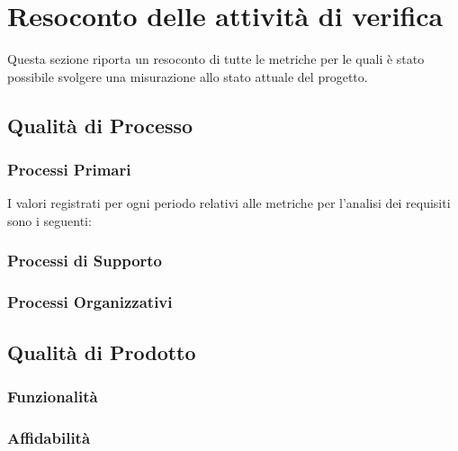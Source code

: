 \section{Resoconto delle attività di verifica}
	Questa sezione riporta un resoconto di tutte le metriche per le quali è stato possibile svolgere una misurazione allo stato attuale del progetto.

	\subsection{Qualità di Processo}
		\subsubsection{Processi Primari}		%
				I valori registrati per ogni periodo relativi alle metriche per l'analisi dei requisiti sono i seguenti:
				
				
				
		
		\subsubsection{Processi di Supporto}	%
				
				
				
		
		\pagebreak		
		\subsubsection{Processi Organizzativi}	%
				
			
	\subsection{Qualità di Prodotto}			%
		\subsubsection{Funzionalità}
		\subsubsection{Affidabilità}
